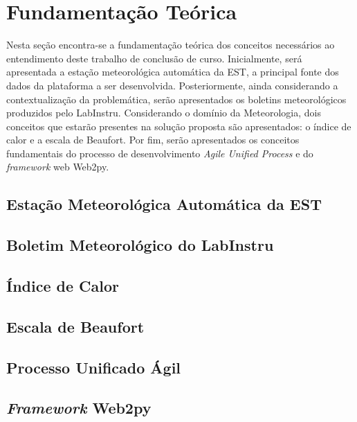 \chapter{Fundamentação Teórica} \label{cap:fundamentacao}

Nesta seção encontra-se a fundamentação teórica dos conceitos necessários ao entendimento deste trabalho de conclusão de curso. Inicialmente, será apresentada a estação meteorológica automática da EST, a principal fonte dos dados da plataforma a ser desenvolvida. Posteriormente, ainda considerando a contextualização da problemática, serão apresentados os boletins meteorológicos produzidos pelo LabInstru. Considerando o domínio da Meteorologia, dois conceitos que estarão presentes na solução proposta são apresentados: o índice de calor e a escala de Beaufort. Por fim, serão apresentados os conceitos fundamentais do processo de desenvolvimento \emph{Agile Unified Process} e do \emph{framework} web Web2py.

\section{Estação Meteorológica Automática da EST}


\section{Boletim Meteorológico do LabInstru} \label{sec:boletim}


\section{Índice de Calor}


\section{Escala de Beaufort}


\section{Processo Unificado Ágil}


\section{\emph{Framework} Web2py} \label{sec:web2py}


